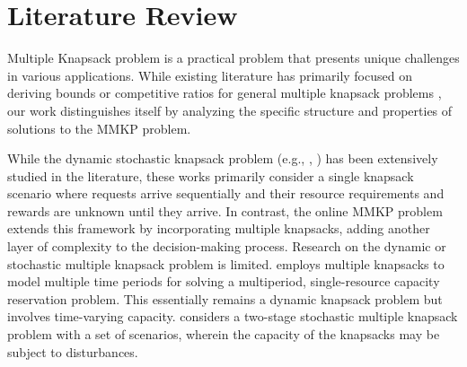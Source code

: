 \section{Literature Review}\label{literature}

Multiple Knapsack problem \citep{martello1990knapsack} is a practical problem that presents unique challenges in various applications. While existing literature has primarily focused on deriving bounds or competitive ratios for general multiple knapsack problems \citep{khuri1994zero, ferreira1996solving, pisinger1999exact, chekuri2005polynomial}, our work distinguishes itself by analyzing the specific structure and properties of solutions to the MMKP problem. 



While the dynamic stochastic knapsack problem (e.g., \citet{kleywegt1998dynamic, kleywegt2001dynamic}, \citet{papastavrou1996dynamic}) has been extensively studied in the literature, these works primarily consider a single knapsack scenario where requests arrive sequentially and their resource requirements and rewards are unknown until they arrive. In contrast, the online MMKP problem extends this framework by incorporating multiple knapsacks, adding another layer of complexity to the decision-making process.
Research on the dynamic or stochastic multiple knapsack problem is limited. \citet{perry2009approximate} employs multiple knapsacks to model multiple time periods for solving a multiperiod, single-resource capacity reservation problem. This essentially remains a dynamic knapsack problem but involves time-varying capacity. \citet{tonissen2017column} considers a two-stage stochastic multiple knapsack problem with a set of scenarios, wherein the capacity of the knapsacks may be subject to disturbances.

